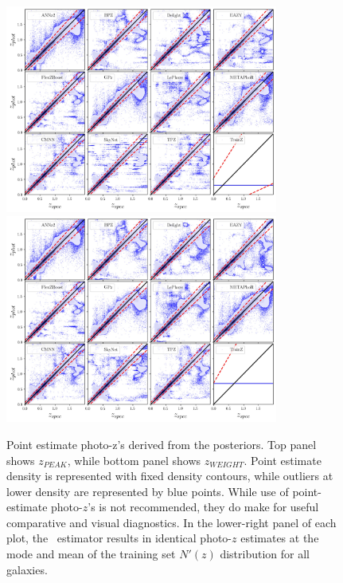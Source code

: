 \begin{figure}
\centering
\includegraphics[width=0.8\textwidth]{fig/ZPEAK_szpz_threecolumn_12codes_navy_lowalpha.jpg}\\
\includegraphics[width=0.8\textwidth]{fig/ZWEIGHT_szpz_threecolumn_12codes_navy_lowalpha.jpg}
\caption{Point estimate photo-z's derived from the posteriors. Top panel shows $z_{PEAK}$, while bottom panel shows $z_{WEIGHT}$.  Point estimate density is represented with fixed density contours, while outliers at lower density are represented by blue points.  While use of point-estimate photo-$z$'s is not recommended, they do make for useful comparative and visual diagnostics.  In the lower-right panel of each plot, the \trainz\ estimator results in identical photo-$z$ estimates at the mode and mean of the training set $N'(z)$ distribution for all galaxies.} \label{fig:pz_pointestimates}
\end{figure}


